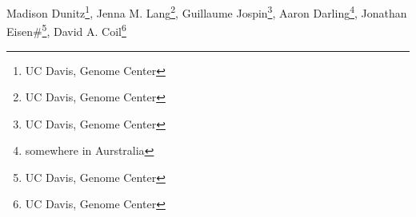 Madison Dunitz\*\footnote{UC Davis, Genome Center}, Jenna M. Lang\*\footnote{UC Davis, Genome Center}, Guillaume Jospin\footnote{UC Davis, Genome Center}, Aaron Darling\footnote{somewhere in Aurstralia}, Jonathan Eisen\#\footnote{UC Davis, Genome Center}, David A. Coil\footnote{UC Davis, Genome Center} 
